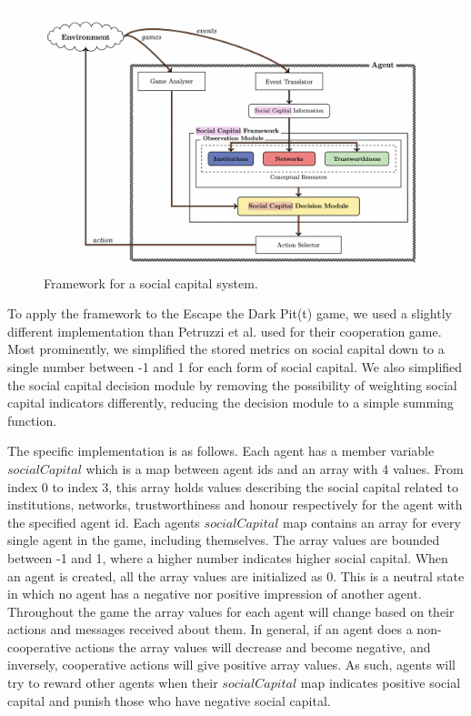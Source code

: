\begin{figure}[!h]
    \centering
    \includegraphics[width=0.75\linewidth]{004_team_1_agent_design/images/socialcapitalframework.png}
    \caption{Framework for a social capital system.\cite{pitt}}
    \label{fig:social_capital_framework}
\end{figure}

To apply the framework to the Escape the Dark Pit(t) game, we used a slightly different implementation than Petruzzi et al. used for their cooperation game. Most prominently, we simplified the stored metrics on social capital down to a single number between -1 and 1 for each form of social capital. We also simplified the social capital decision module by removing the possibility of weighting social capital indicators differently, reducing the decision module to a simple summing function. 

The specific implementation is as follows. Each agent has a member variable $socialCapital$ which is a map between agent ids and an array with 4 values. From index 0 to index 3, this array holds values describing the social capital related to institutions, networks, trustworthiness and honour respectively for the agent with the specified agent id. Each agents $socialCapital$ map contains an array for every single agent in the game, including themselves. The array values are bounded between -1 and 1, where a higher number indicates higher social capital. When an agent is created, all the array values are initialized as 0. This is a neutral state in which no agent has a negative nor positive impression of another agent. Throughout the game the array values for each agent will change based on their actions and messages received about them. In general, if an agent does a non-cooperative actions the array values will decrease and become negative, and inversely, cooperative actions will give positive array values. As such, agents will try to reward other agents when their $socialCapital$ map indicates positive social capital and punish those who have negative social capital.

